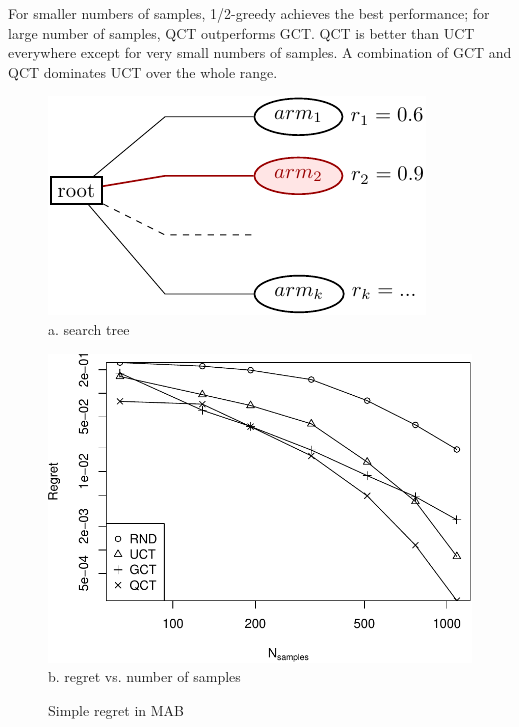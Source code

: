 \documentclass{article}
\begin{document}
For smaller numbers of samples, 1/2-greedy achieves the best
performance; for large number of samples, QCT outperforms GCT. QCT is
better than UCT everywhere except for very small numbers of samples. A
combination of GCT and QCT dominates UCT over the whole range.

\begin{figure}[ht]
  \begin{minipage}[c]{0.5\linewidth}
    \centering
    \includegraphics[scale=1.0]{onelevel-tree.pdf}\\
    \vspace{4em}
    a. search tree
  \end{minipage}
  \begin{minipage}[c]{0.5\linewidth}
    \centering
    \includegraphics[scale=0.5]{flat-trilevel-k=64-uqb=8.pdf}\\
    b. regret vs. number of samples
  \end{minipage}
  \label{fig:mab-simple-regret}
  \caption{Simple regret in MAB}
\end{figure}
\end{document}

